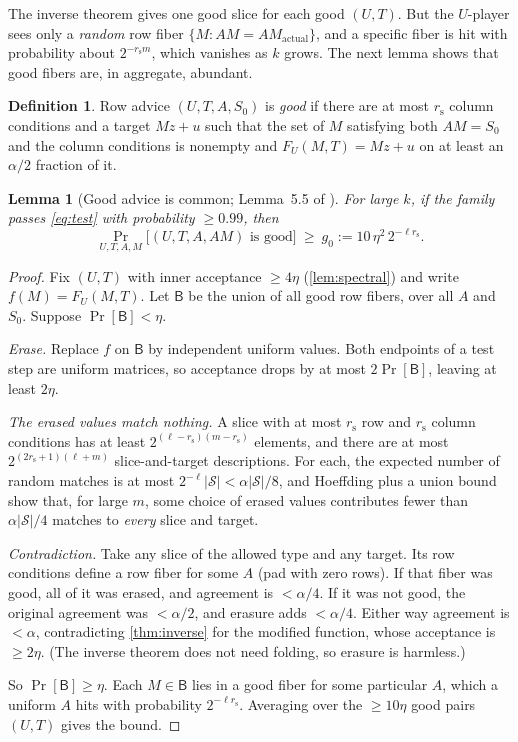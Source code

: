 \documentclass[11pt]{article}
\newtheorem{lemma}[theorem]{Lemma}
\theoremstyle{definition}
\newtheorem{definition}[theorem]{Definition}
\theoremstyle{remark}
\newcommand{\cS}{\mathcal S}
\newcommand{\rs}{r_{\mathrm s}}
\newcommand{\abs}[1]{\lvert #1\rvert}
\begin{document}
The inverse theorem gives one good slice for each good $(U,T)$. But the
$U$-player sees only a \emph{random} row fiber $\{M:AM=AM_{\text{actual}}\}$,
and a specific fiber is hit with probability about $2^{-\rs m}$, which vanishes as
$k$ grows. The next lemma shows that good fibers are, in aggregate, abundant.

\begin{definition}
Row advice $(U,T,A,S_0)$ is \emph{good} if there are at most $\rs$ column
conditions and a target $Mz+u$ such that the set of $M$ satisfying both
$AM=S_0$ and the column conditions is nonempty and
$F_U(M,T)=Mz+u$ on at least an $\alpha/2$ fraction of it.
\end{definition}

\begin{lemma}[Good advice is common; Lemma~5.5 of \cite{OpenAI-UGC}]\label{lem:abundant}
For large $k$, if the family passes \eqref{eq:test} with probability $\ge0.99$,
then
\[
\Pr_{U,T,A,M}\bigl[(U,T,A,AM)\text{ is good}\bigr]\ \ge\ g_0:=10\,\eta^2\,2^{-\ell\rs}.
\]
\end{lemma}

\begin{proof}
Fix $(U,T)$ with inner acceptance $\ge4\eta$ (\cref{lem:spectral}) and write
$f(M)=F_U(M,T)$. Let $\mathsf{B}$ be the union of all good row fibers, over all
$A$ and $S_0$. Suppose $\Pr[\mathsf{B}]<\eta$.

\emph{Erase.} Replace $f$ on $\mathsf{B}$ by independent uniform values. Both
endpoints of a test step are uniform matrices, so acceptance drops by at most
$2\Pr[\mathsf{B}]$, leaving at least $2\eta$.

\emph{The erased values match nothing.} A slice with at most $\rs$ row and
$\rs$ column conditions has at least $2^{(\ell-\rs)(m-\rs)}$ elements, and there
are at most $2^{(2\rs+1)(\ell+m)}$ slice-and-target descriptions. For each, the
expected number of random matches is at most $2^{-\ell}\abs{\cS}<\alpha\abs\cS/8$, and
Hoeffding plus a union bound show that, for large $m$, some choice of erased
values contributes fewer than $\alpha\abs\cS/4$ matches to \emph{every} slice and
target.

\emph{Contradiction.} Take any slice of the allowed type and any target. Its
row conditions define a row fiber for some $A$ (pad with zero rows). If that
fiber was good, all of it was erased, and agreement is $<\alpha/4$. If it was
not good, the original agreement was $<\alpha/2$, and erasure adds $<\alpha/4$.
Either way agreement is $<\alpha$, contradicting \cref{thm:inverse} for the
modified function, whose acceptance is $\ge2\eta$. (The inverse theorem does
not need folding, so erasure is harmless.)

So $\Pr[\mathsf{B}]\ge\eta$. Each $M\in\mathsf{B}$ lies in a good fiber for some
particular $A$, which a uniform $A$ hits with probability $2^{-\ell\rs}$. Averaging
over the $\ge10\eta$ good pairs $(U,T)$ gives the bound.
\end{proof}
\end{document}
